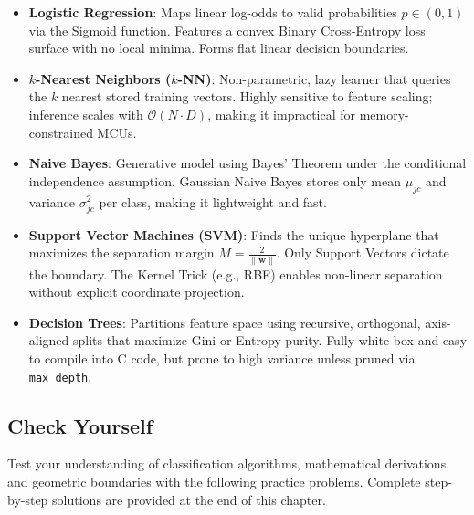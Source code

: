 \begin{takeaways}
\begin{itemize}
    \item \textbf{Logistic Regression}: Maps linear log-odds to valid probabilities $p \in (0, 1)$ via the Sigmoid function. Features a convex Binary Cross-Entropy loss surface with no local minima. Forms flat linear decision boundaries.
    \item \textbf{$k$-Nearest Neighbors ($k$-NN)}: Non-parametric, lazy learner that queries the $k$ nearest stored training vectors. Highly sensitive to feature scaling; inference scales with $\mathcal{O}(N \cdot D)$, making it impractical for memory-constrained MCUs.
    \item \textbf{Naive Bayes}: Generative model using Bayes' Theorem under the conditional independence assumption. Gaussian Naive Bayes stores only mean $\mu_{jc}$ and variance $\sigma_{jc}^2$ per class, making it lightweight and fast.
    \item \textbf{Support Vector Machines (SVM)}: Finds the unique hyperplane that maximizes the separation margin $M = \frac{2}{\|\mathbf{w}\|}$. Only Support Vectors dictate the boundary. The Kernel Trick (e.g., RBF) enables non-linear separation without explicit coordinate projection.
    \item \textbf{Decision Trees}: Partitions feature space using recursive, orthogonal, axis-aligned splits that maximize Gini or Entropy purity. Fully white-box and easy to compile into C code, but prone to high variance unless pruned via \texttt{max\_depth}.
\end{itemize}
\end{takeaways}

\subsection{Check Yourself}\label{subsec:classification_check_yourself}

Test your understanding of classification algorithms, mathematical derivations, and geometric boundaries with the following practice problems. Complete step-by-step solutions are provided at the end of this chapter.

